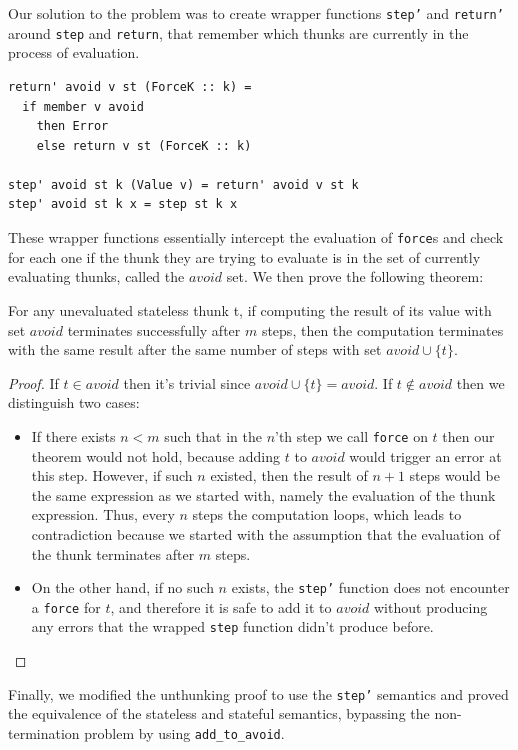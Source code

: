 \documentclass[sigconf]{acmart}
\newcommand{\hsinl}[1]{\texttt{#1}}
\newcommand{\code}[1]{\texttt{#1}}
\begin{document}
Our solution to the problem was to create wrapper functions \hsinl{step'} and
\hsinl{return'} around \hsinl{step} and \hsinl{return}, that remember which
thunks are currently in the process of evaluation.
\begin{verbatim}
return' avoid v st (ForceK :: k) =
  if member v avoid
    then Error
    else return v st (ForceK :: k)

step' avoid st k (Value v) = return' avoid v st k
step' avoid st k x = step st k x
\end{verbatim}
These wrapper functions essentially intercept the evaluation of \code{force}s and
check for each one if the thunk they are trying to evaluate is in the set of
currently evaluating thunks, called the $avoid$ set. We then prove the
following theorem:
\begin{theorem} For any unevaluated stateless thunk t, if
  computing the result of its value with set $avoid$ terminates
  successfully after $m$ steps, then the computation terminates with the same
  result after the same number of steps with set $avoid \cup \{t\}$.
\end{theorem}
\renewcommand*{\proofname}{Proof outline}
\begin{proof}
  If $t \in avoid$ then it's trivial since $avoid \cup \{t\} = avoid$.
  If $t \notin avoid$ then we distinguish two cases:
  \begin{itemize}
    \item If there exists $n < m$ such that in the $n$'th step we call
      \code{force} on $t$ then our theorem would not hold, because adding $t$ to
      $avoid$ would trigger an error at this step. However, if such $n$ existed,
      then the result of $n+1$ steps would be the same expression as we started
      with, namely the evaluation of the thunk expression. Thus, every $n$ steps
      the computation loops, which leads to contradiction because we started
      with the assumption that the evaluation of the thunk terminates after $m$
      steps.
    \item On the other hand, if no such $n$ exists, the \hsinl{step'} function
      does not encounter a \code{force} for $t$, and therefore it is safe to add
      it to $avoid$ without producing any errors that the wrapped \hsinl{step}
      function didn't produce before.
  \end{itemize}
\end{proof}

Finally, we modified the unthunking proof to use the \hsinl{step'} semantics and
proved the equivalence of the stateless and stateful semantics, bypassing the
non-termination problem by using \code{add\_to\_avoid}.
\end{document}
